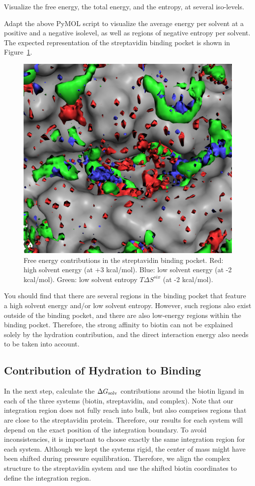 \documentclass[9pt,tutorial]{livecoms}
\newcommand{\dgsolv}{\Delta G_\textup{solv}}
\begin{document}
Visualize the free energy, the total energy, and the entropy, at several iso-levels.

Adapt the above PyMOL script to visualize the average energy per solvent at a positive and a negative isolevel, as well as regions of negative entropy per solvent.
The expected representation of the streptavidin binding pocket is shown in Figure~\ref{fig_binding_pocket_pymol}.

\begin{figure}
	\centering
	\includegraphics[width=0.8\linewidth]{figures/binding_pocket_S_-2_E_-2_E_3.png}
	\caption{Free energy contributions in the streptavidin binding pocket. Red: high solvent energy (at +3 kcal/mol). Blue: low solvent energy (at -2 kcal/mol). Green: low solvent entropy $T\Delta S^{six}$ (at -2 kcal/mol).}\label{fig_binding_pocket_pymol}
\end{figure}

You should find that there are several regions in the binding pocket that feature a high solvent energy and/or low solvent entropy.
However, such regions also exist outside of the binding pocket, and there are also low-energy regions within the binding pocket.
Therefore, the strong affinity to biotin can not be explained solely by the hydration contribution, and the direct interaction energy also needs to be taken into account.

\subsection{Contribution of Hydration to Binding}
In the next step, calculate the $\dgsolv$ contributions around the biotin ligand in each of the three systems (biotin, streptavidin, and complex).
Note that our integration region does not fully reach into bulk, but also comprises regions that are close to the streptavidin protein. 
Therefore, our results for each system will depend on the exact position of the integration boundary. 
To avoid inconsistencies, it is important to choose exactly the same integration region for each system.
Although we kept the systems rigid, the center of mass might have been shifted during pressure equilibration.
Therefore, we align the complex structure to the streptavidin system and use the shifted biotin coordinates to define the integration region.
\end{document}
